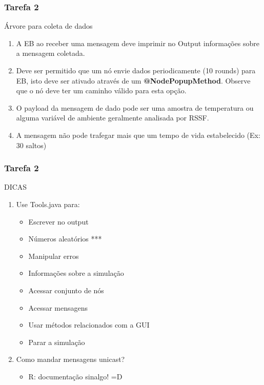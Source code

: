 \documentclass{beamer}
\begin{document}
\begin{frame}
	\frametitle{Tarefa 2}
	\begin{alertblock}{Árvore para coleta de dados}
		\begin{enumerate}
			
			\item A EB ao receber uma mensagem deve imprimir no Output informações sobre a mensagem coletada.
				
			\item Deve ser permitido que um nó envie dados periodicamente (10 rounds) para EB, isto deve ser ativado através de um \textbf{@NodePopupMethod}. Observe que o nó deve ter um caminho válido para esta opção.  

			\item O payload da mensagem de dado pode ser uma amostra de temperatura ou alguma variável de ambiente geralmente analisada por RSSF.
			
			\item A mensagem não pode trafegar mais que um tempo de vida estabelecido (Ex: 30 saltos)
		\end{enumerate}
	\end{alertblock}
\end{frame}

\begin{frame}
	\frametitle{Tarefa 2}
	\begin{block}{DICAS}
		\begin{enumerate}
			\item Use Tools.java para:
			\begin{itemize}
				\item Escrever no output
				\item Números aleatórios ***
				\item Manipular erros
				\item Informações sobre a simulação
				\item Acessar conjunto de nós
				\item Acessar mensagens
				\item Usar métodos relacionados com a GUI
				\item Parar a simulação
			\end{itemize}
			\item Como mandar mensagens unicast? 
			\begin{itemize}
				\item R: documentação sinalgo! =D
			\end{itemize}
		\end{enumerate}
	\end{block}
\end{frame}
\end{document}
